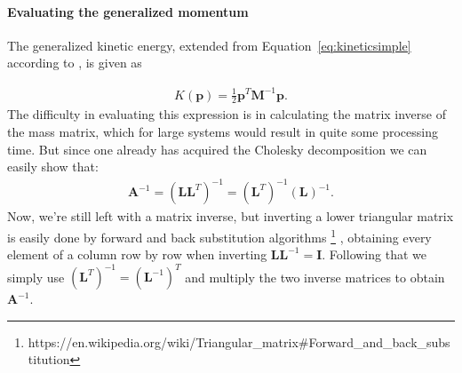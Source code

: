 \paragraph{Evaluating the generalized momentum}
The generalized kinetic energy, extended from Equation~\ref{eq:kineticsimple} according to \cite{neal2011mcmc}, is given as

\begin{gather}
	K(\mathbf{p}) = \frac{1}{2} \mathbf{p}^T \mathbf{M}^{-1} \mathbf{p}.
\end{gather}
The difficulty in evaluating this expression is in calculating the matrix inverse of the mass matrix, which for large systems would result in quite some processing time. But since one already has acquired the Cholesky decomposition we can easily show that:
\begin{gather}
	\mathbf{A} ^{-1} = \left( \mathbf{L} \mathbf{L}^T \right)^{-1} = \left(\mathbf{L}^T\right)^{-1} \left( \mathbf{L} \right) ^{-1}.
\end{gather}
Now, we're still left with a matrix inverse, but inverting a lower triangular matrix is easily done by forward and back substitution algorithms
\footnote{https://en.wikipedia.org/wiki/Triangular\_matrix\#Forward\_and\_back\_substitution}
, obtaining every element of a column row by row when inverting $\mathbf{L} \mathbf{L}^{-1} = \mathbf{I}$. Following that we simply use $({\mathbf{L}^T})^{-1} =({\mathbf{L}^{-1}})^{T} $ and multiply the two inverse matrices to obtain $\mathbf{A}^{-1}$.







